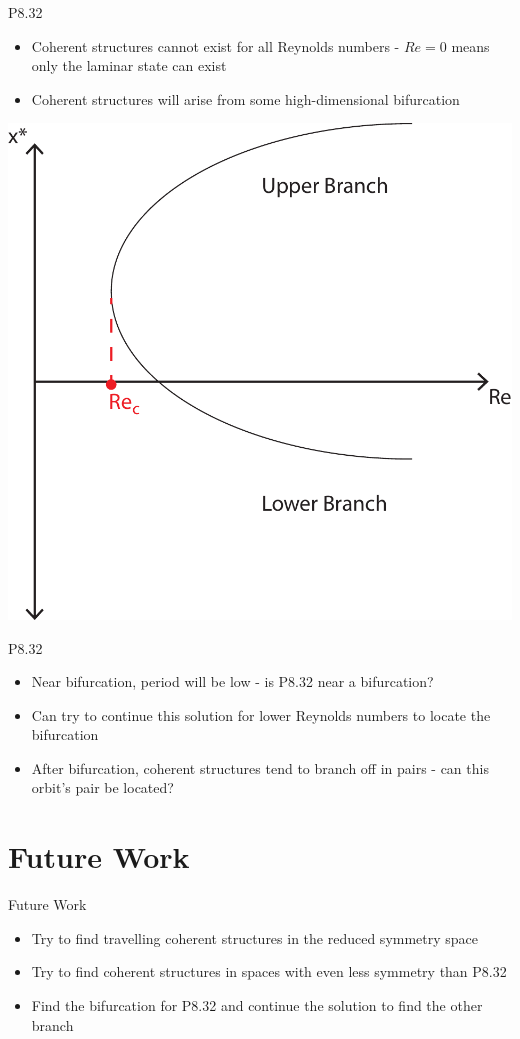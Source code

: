 \documentclass[10pt]{beamer}
\begin{document}
\begin{frame}{P8.32}
\begin{itemize}
\item<1-> Coherent structures cannot exist for all Reynolds numbers - $Re = 0$ means only the laminar state can exist
\item <2-> Coherent structures will arise from some high-dimensional bifurcation 
\end{itemize}
\pause
\hspace{2cm} \includegraphics[scale=0.3]{Images/bifurcationDiagram.pdf}
\end{frame}

\begin{frame}{P8.32}
\begin{itemize}
\item <1-> Near bifurcation, period will be low - is P8.32 near a bifurcation? 
\item <2-> Can try to continue this solution for lower Reynolds numbers to locate the bifurcation
\item <3-> After bifurcation, coherent structures tend to branch off in pairs - can this orbit's pair be located?
\end{itemize}
\end{frame}
\section{Future Work} 
\begin{frame}{Future Work}
\begin{itemize}
\item<1-> Try to find travelling coherent structures in the reduced symmetry space
\item<2-> Try to find coherent structures in spaces with even less symmetry than P8.32
\item<3-> Find the bifurcation for P8.32 and continue the solution to find the other branch 
\end{itemize}
\end{frame}
\end{document}
